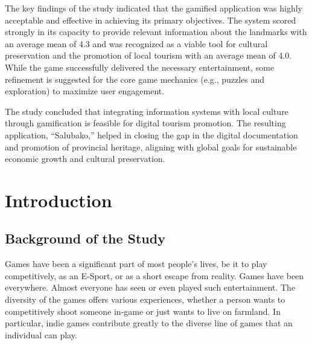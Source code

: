 \documentclass{research}
\begin{document}
The key findings of the study indicated that the gamified application was highly
acceptable and effective in achieving its primary objectives. The system scored strongly
in its capacity to provide relevant information about the landmarks with an average
mean of 4.3 and was recognized as a viable tool for cultural preservation and the
promotion of local tourism with an average mean of 4.0. While the game successfully
delivered the necessary entertainment, some refinement is suggested for the core game
mechanics (e.g., puzzles and exploration) to maximize user engagement.

The study concluded that integrating information systems with local culture through
gamification is feasible for digital tourism promotion. The resulting application,
``Salubako,'' helped in closing the gap in the digital documentation and promotion of
provincial heritage, aligning with global goals for sustainable economic growth and
cultural preservation.

\clearpage

\tableofcontents
\clearpage

\listoffigures
\clearpage

\listoftables
\clearpage

\chapter{Introduction}

\section{Background of the Study}

Games have been a significant part of most people's lives, be it to play competitively,
as an E-Sport, or as a short escape from reality. Games have been everywhere. Almost
everyone has seen or even played such entertainment. The diversity of the games offers
various experiences, whether a person wants to competitively shoot someone in-game or
just wants to live on farmland. In particular, indie games contribute greatly to the
diverse line of games that an individual can play.
\end{document}
